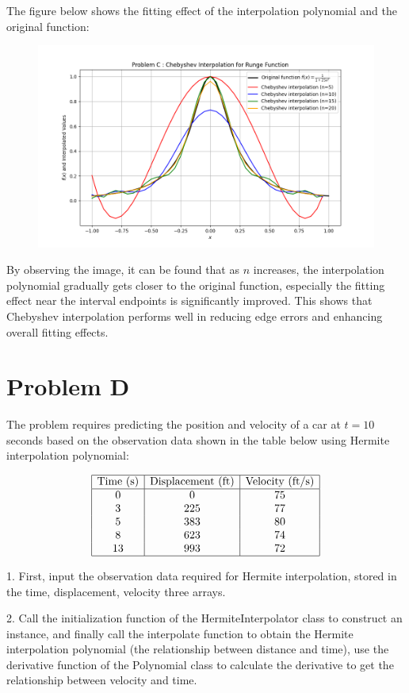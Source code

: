 \documentclass[a4paper]{article}
\begin{document}
The figure below shows the fitting effect of the interpolation polynomial and the original function:
\begin{figure}[h]
    \centering
    \includegraphics[width=0.75\linewidth]{Pictures/ProblemC_figure.png}
\end{figure}

By observing the image, it can be found that as \( n \) increases, the interpolation polynomial gradually gets closer to the original function, especially the fitting effect near the interval endpoints is significantly improved. This shows that Chebyshev interpolation performs well in reducing edge errors and enhancing overall fitting effects.

\newpage
\section*{Problem D}

The problem requires predicting the position and velocity of a car at \( t = 10 \) seconds based on the observation data shown in the table below using Hermite interpolation polynomial:

\[
\begin{array}{|c|c|c|}
\hline
\text{Time (s)} & \text{Displacement (ft)} & \text{Velocity (ft/s)} \\
\hline
0 & 0 & 75 \\
3 & 225 & 77 \\
5 & 383 & 80 \\
8 & 623 & 74 \\
13 & 993 & 72 \\
\hline
\end{array}
\]

1. First, input the observation data required for Hermite interpolation, stored in the time, displacement, velocity three arrays.

2. Call the initialization function of the HermiteInterpolator class to construct an instance, and finally call the interpolate function to obtain the Hermite interpolation polynomial (the relationship between distance and time), use the derivative function of the Polynomial class to calculate the derivative to get the relationship between velocity and time.
\end{document}

